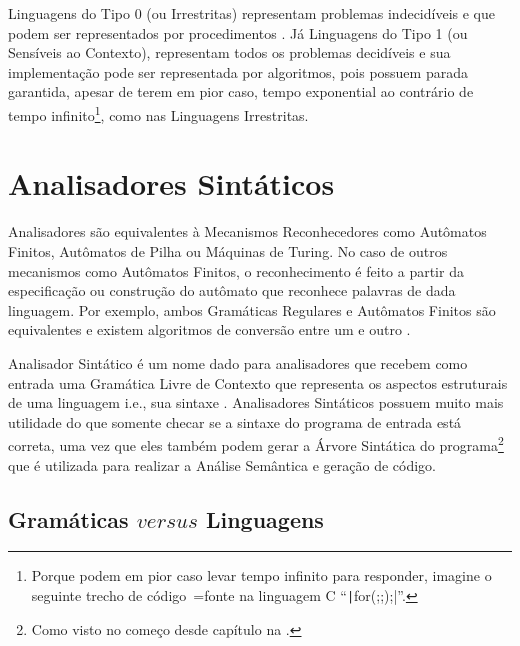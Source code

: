 Linguagens do Tipo 0 (ou Irrestritas) representam problemas indecidíveis e
que podem ser representados por procedimentos \cite{sipserBook}.
Já Linguagens do Tipo 1 (ou Sensíveis ao Contexto),
representam todos os problemas decidíveis e
sua implementação pode ser representada por algoritmos,
pois possuem parada garantida,
apesar de terem em pior caso,
tempo exponential ao contrário de tempo infinito\footnote{
Porque podem em pior caso levar tempo infinito para responder,
imagine o seguinte trecho de código~=fonte na linguagem C ``\texttt|for(;;);|''.
},
como nas Linguagens Irrestritas.


\section{Analisadores Sintáticos}
\label{section:analisadoresSintaticos}

Analisadores são equivalentes à Mecanismos Reconhecedores como Autômatos Finitos,
Autômatos de Pilha ou
Máquinas de Turing.
No caso de outros mecanismos como Autômatos Finitos,
o reconhecimento é feito a partir da especificação ou
construção do autômato que reconhece palavras de dada linguagem.
Por exemplo,
ambos Gramáticas Regulares e
Autômatos Finitos são equivalentes e
existem algoritmos de conversão entre um e
outro \cite{hopcroftBook}.

Analisador Sintático
é um nome dado para analisadores que recebem como entrada uma Gramática Livre de Contexto que representa os aspectos estruturais de uma linguagem i.e.,
sua sintaxe \cite{ahoCompilerDragonBook}.
Analisadores Sintáticos possuem muito mais utilidade do que somente checar se a sintaxe do programa de entrada está correta,
uma vez que eles também podem gerar a Árvore Sintática do programa\footnote{
Como visto no começo desde capítulo na .
}
que é utilizada para realizar a Análise Semântica e
geração de código.


\subsection{Gramáticas $versus$ Linguagens}
\label{section:gramaticasVersusLinguagens}

